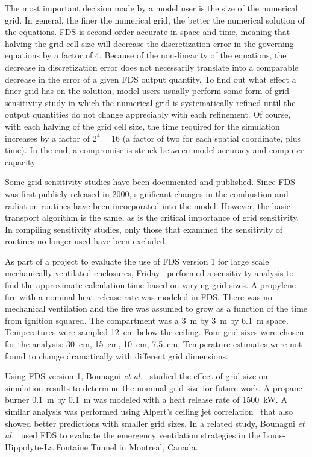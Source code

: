\documentclass[11pt]{book}
\begin{document}
\label{gridsen}

The most  important decision made by a  model user is the  size of the numerical grid. In  general, the finer the numerical  grid, the better the
numerical solution of  the equations. FDS is second-order accurate in  space and  time,  meaning that  halving  the grid  cell size  will decrease
the discretization  error in  the governing  equations  by a factor  of 4.  Because  of  the non-linearity  of  the equations,  the decrease in
discretization error does not necessarily translate into a comparable decrease  in the error of  a given FDS  output quantity. To find out  what
effect a  finer grid has  on the solution,  model users usually  perform some  form of  grid  sensitivity study  in which  the numerical grid  is
systematically refined until  the output quantities do not change  appreciably with each refinement. Of  course, with each halving of  the grid cell
size,  the time required  for the simulation increases by  a factor of $2^4=16$  (a factor of two  for each spatial coordinate, plus  time). In  the
end, a  compromise is  struck between model accuracy and computer capacity.

Some   grid    sensitivity   studies   have    been   documented   and published. Since FDS was  first publicly released in 2000, significant changes
in  the   combustion  and   radiation  routines   have  been incorporated into the model. However, the basic transport algorithm is the  same, as  is
the  critical importance  of  grid sensitivity.  In compiling   sensitivity  studies,   only  those   that   examined  the sensitivity of routines no
longer used have been excluded.

As part of  a project to evaluate  the use of FDS version  1 for large scale   mechanically  ventilated   enclosures,  Friday~\cite{Friday:1}
performed a  sensitivity analysis to find  the approximate calculation time based on varying grid sizes. A propylene fire with a nominal heat release
rate was  modeled in FDS. There was  no mechanical ventilation and  the fire  was assumed  to grow  as a  function of  the  time from ignition
squared.  The  compartment  was   a  3~m  by  3~m  by  6.1~m space. Temperatures  were sampled 12~cm  below the ceiling.  Four grid sizes   were
chosen  for   the   analysis:   30~cm,  15~cm,   10~cm, 7.5~cm. Temperature  estimates were  not found to  change dramatically with different grid
dimensions.

Using FDS  version 1, Bounagui {\em  et al.}~\cite{Bounagui:1} studied the effect of grid size on simulation results to determine the nominal grid
size for future work. A propane burner 0.1~m by 0.1~m was modeled with  a heat  release rate  of  1500~kW.   A similar analysis was performed using
Alpert's ceiling  jet correlation~\cite{SFPE:Alpert}  that also showed better  predictions   with smaller grid sizes.  In a  related study,  Bounagui
{\em  et al.}~\cite{Bounagui:2} used  FDS to  evaluate  the emergency  ventilation  strategies in  the Louis-Hippolyte-La Fontaine Tunnel in
Montreal, Canada.
\end{document}
